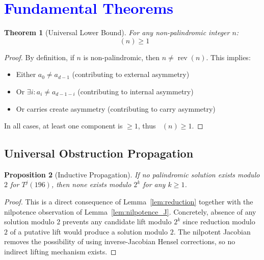 \documentclass[11pt,a4paper]{article}
\theoremstyle{plain}
\newtheorem{theorem}{Theorem}[section]
\newtheorem{proposition}[theorem]{Proposition}
\theoremstyle{definition}
\DeclareMathOperator{\rev}{rev}
\DeclareMathOperator{\Arobust}{A^{\text{(robust)}}}
\begin{document}
\section{\textcolor{blue}{Fundamental Theorems}}

\begin{theorem}[Universal Lower Bound]\label{thm:lower_bound}
For any non-palindromic integer $n$:
\begin{equation}
\Arobust(n) \geq 1
\end{equation}
\end{theorem}

\begin{proof}
By definition, if $n$ is non-palindromic, then $n \neq \rev(n)$. This implies:
\begin{itemize}
\item Either $a_0 \neq a_{d-1}$ (contributing to external asymmetry)
\item Or $\exists i : a_i \neq a_{d-1-i}$ (contributing to internal asymmetry)
\item Or carries create asymmetry (contributing to carry asymmetry)
\end{itemize}
In all cases, at least one component is $\geq 1$, thus $\Arobust(n) \geq 1$.
\end{proof}

\subsection{Universal Obstruction Propagation}
\label{subsec:universal_propagation}

\begin{proposition}[Inductive Propagation]\label{prop:propagation}
If no palindromic solution exists modulo $2$ for $T^j(196)$, then none exists modulo $2^k$ for any $k \geq 1$.
\end{proposition}

\begin{proof}
This is a direct consequence of Lemma~\ref{lem:reduction} together with the nilpotence observation of Lemma~\ref{lem:nilpotence_J}. Concretely, absence of any solution modulo $2$ prevents any candidate lift modulo $2^k$ since reduction modulo $2$ of a putative lift would produce a solution modulo $2$. The nilpotent Jacobian removes the possibility of using inverse-Jacobian Hensel corrections, so no indirect lifting mechanism exists.
\end{proof}
\end{document}
